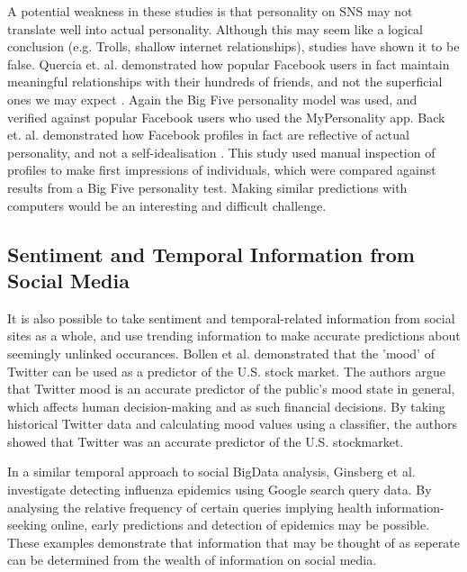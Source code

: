A potential weakness in these studies is that personality on SNS may not translate well into actual personality. Although this may seem like a logical conclusion (e.g. Trolls, shallow internet relationships), studies have shown it to be false. Quercia et. al. demonstrated how popular Facebook users in fact maintain meaningful relationships with their hundreds of friends, and not the superficial ones we may expect \cite{quercia2012personality}. Again the Big Five personality model was used, and verified against popular Facebook users who used the MyPersonality app. Back et. al. demonstrated how Facebook profiles in fact are reflective of actual personality, and not a self-idealisation \cite{back2010facebook}. This study used manual inspection of profiles to make first impressions of individuals, which were compared against results from a Big Five personality test. Making similar predictions with computers would be an interesting and difficult challenge. 

\subsection{Sentiment and Temporal Information from Social Media}

It is also possible to take sentiment and temporal-related information from social sites as a whole, and use trending information to make accurate predictions about seemingly unlinked occurances. Bollen et al. \cite{bollen2011twitter} demonstrated that the 'mood' of Twitter can be used as a predictor of the U.S. stock market. The authors argue that Twitter mood is an accurate predictor of the public's mood state in general, which affects human decision-making and as such financial decisions. By taking historical Twitter data and calculating mood values using a classifier, the authors showed that Twitter was an accurate predictor of the U.S. stockmarket.

In a similar temporal approach to social BigData analysis, Ginsberg et al. \cite{ginsberg2008detecting} investigate detecting influenza epidemics using Google search query data. By analysing the relative frequency of certain queries implying health information-seeking online, early predictions and detection of epidemics may be possible. These examples demonstrate that information that may be thought of as seperate can be determined from the wealth of information on social media.


